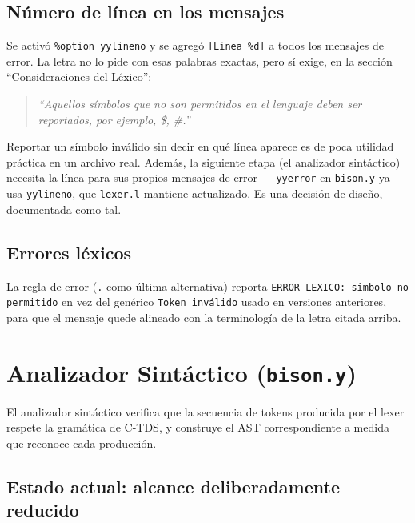 \documentclass[11pt,a4paper]{article}
\begin{document}
\subsection{N\'umero de l\'inea en los mensajes}

Se activ\'o \texttt{\%option yylineno} y se agreg\'o \texttt{[Linea \%d]}
a todos los mensajes de error. La letra no lo pide con esas palabras
exactas, pero s\'i exige, en la secci\'on ``Consideraciones del L\'exico'':

\begin{quote}
\emph{``Aquellos s\'imbolos que no son permitidos en el lenguaje deben ser
reportados, por ejemplo, \$, \#.''}
\end{quote}

Reportar un s\'imbolo inv\'alido sin decir en qu\'e l\'inea aparece es de
poca utilidad pr\'actica en un archivo real. Adem\'as, la siguiente etapa
(el analizador sint\'actico) necesita la l\'inea para sus propios mensajes
de error --- \texttt{yyerror} en \texttt{bison.y} ya usa
\texttt{yylineno}, que \texttt{lexer.l} mantiene actualizado. Es una
decisi\'on de dise\~no, documentada como tal.

\subsection{Errores l\'exicos}

La regla de error (\texttt{.} como \'ultima alternativa) reporta
\texttt{ERROR LEXICO: simbolo no permitido} en vez del gen\'erico
\texttt{Token inv\'alido} usado en versiones anteriores, para que el
mensaje quede alineado con la terminolog\'ia de la letra citada arriba.

\section{Analizador Sint\'actico (\texttt{bison.y})}

El analizador sint\'actico verifica que la secuencia de tokens producida
por el lexer respete la gram\'atica de C-TDS, y construye el AST
correspondiente a medida que reconoce cada producci\'on.

\subsection{Estado actual: alcance deliberadamente reducido}
\end{document}
